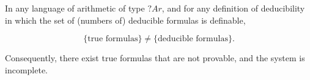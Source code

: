 In any language of arithmetic of type $?Ar$, and for any definition of deducibility in which the set of (numbers of) deducible formulas is definable,

$$\{\text{true formulas}\} \neq \{\text{deducible formulas}\}.$$

Consequently, there exist true formulas that are not provable, and the system is incomplete.
